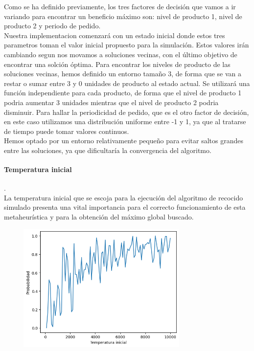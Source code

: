 \documentclass[a4paper,12pt]{article}
\begin{document}
	
	Como se ha definido previamente, los tres factores de decisión que vamos a ir variando para encontrar un beneficio máximo son: nivel de producto 1, nivel de producto 2 y periodo de pedido. \\
	Nuestra implementacion comenzará con un estado inicial donde estos tres parametros toman el valor inicial propuesto para la simulación. Estos valores irán cambiando segun nos movamos a soluciones vecinas, con el último objetivo de 
	encontrar una solción óptima. 
	Para encontrar los niveles de producto de las soluciones vecinas, hemos definido un entorno tamaño 3, de forma que se van a restar o sumar entre 3 y 0 unidades de producto al estado actual. Se utilizará una función 
	independiente para cada producto, de forma que el nivel de producto 1 podria aumentar 3 unidades mientras que el nivel de producto 2 podria disminuir. 
	Para hallar la periodicidad de pedido, que es el otro factor de decisión, en este caso utilizamos una distribución uniforme entre -1 y 1, ya que al tratarse de tiempo puede tomar valores continuos. \\
	Hemos optado por un entorno relativamente pequeño para evitar saltos grandes entre las soluciones, ya que dificultaría la convergencia del algoritmo. 
	
	\paragraph{Temperatura inicial}.\\
	La temperatura inicial que se escoja para la ejecución del algoritmo de recocido simulado presenta una vital importancia para el correcto funcionamiento de esta metaheurística y para la obtención del máximo global buscado.\\

	\begin{figure}[H]
		\centering
		\includegraphics[width=0.75\textwidth]{include/Temperaturas/grafico1.png}
	\end{figure}
\end{document}
